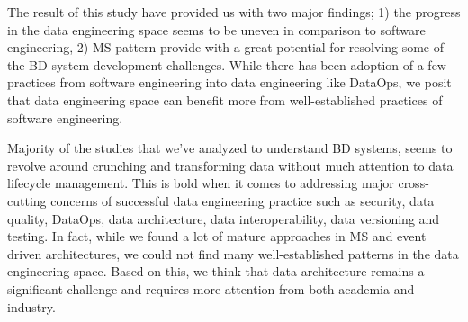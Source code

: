 \documentclass[a4paper,11pt,article,oneside]{memoir}
\begin{document}


The result of this study have provided us with two major findings; 1) the progress in the data engineering space seems to be uneven in comparison to software engineering, 2) MS pattern provide with a great potential for resolving some of the BD system development challenges. While there has been adoption of a few practices from software engineering into data engineering like DataOps, we posit that data engineering space can benefit more from well-established practices of software engineering. 

Majority of the studies that we've analyzed to understand BD systems, seems to revolve around crunching and transforming data without much attention to data lifecycle management. This is bold when it comes to addressing major cross-cutting concerns of successful data engineering practice such as security, data quality, DataOps, data architecture, data interoperability, data versioning and testing. In fact, while we found a lot of mature approaches in MS and event driven architectures, we could not find many well-established patterns in the data engineering space. Based on this, we think that data architecture remains a significant challenge and requires more attention from both academia and industry. 

\end{document}

